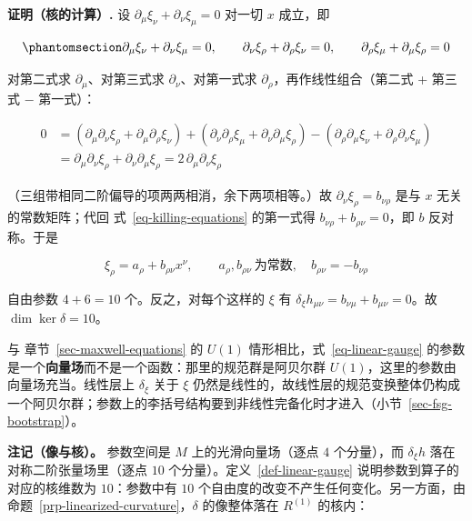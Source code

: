 \documentclass[
  chinese,
  a4paper,
  UTF8,
  12pt,
  oneside,
  openany]{ctexbook}
\theoremstyle{plain}
\theoremstyle{plain}
\theoremstyle{plain}
\theoremstyle{definition}
\theoremstyle{plain}
\theoremstyle{plain}
\theoremstyle{remark}
\begin{document}
\textbf{证明（核的计算）.} 设
\(\partial_{\mu}\xi_{\nu}+\partial_{\nu}\xi_{\mu}=0\) 对一切 \(x\)
成立，即

\begin{equation}\protect\phantomsection\label{eq-killing-equations}{
\partial_{\mu}\xi_{\nu}+\partial_{\nu}\xi_{\mu}=0,
\qquad
\partial_{\nu}\xi_{\rho}+\partial_{\rho}\xi_{\nu}=0,
\qquad
\partial_{\rho}\xi_{\mu}+\partial_{\mu}\xi_{\rho}=0
}\end{equation}

对第二式求 \(\partial_{\mu}\)、对第三式求 \(\partial_{\nu}\)、对第一式求
\(\partial_{\rho}\)，再作线性组合（第二式 + 第三式 − 第一式）：

\[
\begin{aligned}
0&=\left(\partial_{\mu}\partial_{\nu}\xi_{\rho}+\partial_{\mu}\partial_{\rho}\xi_{\nu}\right)
+\left(\partial_{\nu}\partial_{\rho}\xi_{\mu}+\partial_{\nu}\partial_{\mu}\xi_{\rho}\right)
-\left(\partial_{\rho}\partial_{\mu}\xi_{\nu}+\partial_{\rho}\partial_{\nu}\xi_{\mu}\right)\\
&=\partial_{\mu}\partial_{\nu}\xi_{\rho}+\partial_{\nu}\partial_{\mu}\xi_{\rho}
=2\,\partial_{\mu}\partial_{\nu}\xi_{\rho}
\end{aligned}
\]

（三组带相同二阶偏导的项两两相消，余下两项相等。）故
\(\partial_{\nu}\xi_{\rho}=b_{\nu\rho}\) 是与 \(x\) 无关的常数矩阵；代回
式~\ref{eq-killing-equations} 的第一式得
\(b_{\nu\rho}+b_{\rho\nu}=0\)，即 \(b\) 反对称。于是

\[
\xi_{\rho}=a_{\rho}+b_{\rho\nu}x^{\nu},
\qquad
a_{\rho},b_{\rho\nu}\ \text{为常数},\quad b_{\rho\nu}=-b_{\nu\rho}
\]

自由参数 \(4+6=10\) 个。反之，对每个这样的 \(\xi\) 有
\(\delta_{\xi}h_{\mu\nu}=b_{\nu\mu}+b_{\mu\nu}=0\)。故
\(\dim\ker\delta=10\)。

与 章节~\ref{sec-maxwell-equations} 的 \(U(1)\)
情形相比，式~\ref{eq-linear-gauge}
的参数是一个\textbf{向量场}而不是一个函数：那里的规范群是阿贝尔群
\(U(1)\)，这里的参数由向量场充当。线性层上 \(\delta_{\xi}\) 关于 \(\xi\)
仍然是线性的，故线性层的规范变换整体仍构成一个阿贝尔群；参数上的李括号结构要到非线性完备化时才进入（小节~\ref{sec-fsg-bootstrap}）。

\textbf{注记（像与核）。} 参数空间是 \(M\) 上的光滑向量场（逐点 \(4\)
个分量），而 \(\delta_{\xi}h\) 落在对称二阶张量场里（逐点 \(10\)
个分量）。定义~\ref{def-linear-gauge} 说明参数到算子的对应的核维数为
\(10\)：参数中有 \(10\) 个自由度的改变不产生任何变化。另一方面，由
命题~\ref{prp-linearized-curvature}，\(\delta\) 的像整体落在 \(R^{(1)}\)
的核内：
\end{document}
